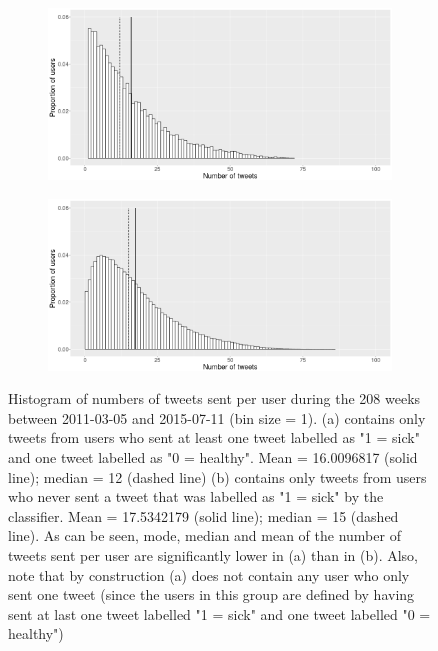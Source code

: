 \documentclass[11pt, a4paper]{report}\usepackage[]{graphicx}\usepackage[]{color}
\begin{document}
\begin{figure}[h]
\centering
  \begin{subfigure}[b]{1\textwidth}
  \includegraphics[width=1\linewidth]{user_activity_both_sick_raw_df.png}
  \caption{}
  \end{subfigure}
  \begin{subfigure}[b]{1\textwidth}
  \includegraphics[width=1\linewidth]{user_activity_only_healthy_sick_raw_df.png}
  \caption{}
  \end{subfigure}
  \caption{Histogram of numbers of tweets sent per user during the 208 weeks between 2011-03-05 and 2015-07-11 (bin size = 1). (a) contains only tweets from users who sent at least one tweet labelled as "1 = sick" and one tweet labelled as "0 = healthy".  Mean = 16.0096817 (solid line); median = 12 (dashed line) (b) contains only tweets from users who never sent a tweet that was labelled as "1 = sick" by the classifier.  Mean = 17.5342179 (solid line); median = 15 (dashed line). As can be seen, mode, median and mean of the number of tweets sent per user are significantly lower in (a) than in (b). Also, note that by construction (a) does not contain any user who only sent one tweet (since the users in this group are defined by having sent at last one tweet labelled "1 = sick" and one tweet labelled "0 = healthy")}
  \label{fig:both_vs_healthy_only_hist}

\end{figure}
\end{document}
